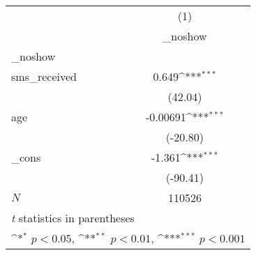 {
\def\sym#1{\ifmmode^{#1}\else\(^{#1}\)\fi}
\begin{tabular}{l*{1}{c}}
\hline\hline
            &\multicolumn{1}{c}{(1)}\\
            &\multicolumn{1}{c}{\_noshow}\\
\hline
\_noshow     &                     \\
sms\_received&       0.649\sym{***}\\
            &     (42.04)         \\
[1em]
age         &    -0.00691\sym{***}\\
            &    (-20.80)         \\
[1em]
\_cons      &      -1.361\sym{***}\\
            &    (-90.41)         \\
\hline
\(N\)       &      110526         \\
\hline\hline
\multicolumn{2}{l}{\footnotesize \textit{t} statistics in parentheses}\\
\multicolumn{2}{l}{\footnotesize \sym{*} \(p<0.05\), \sym{**} \(p<0.01\), \sym{***} \(p<0.001\)}\\
\end{tabular}
}
